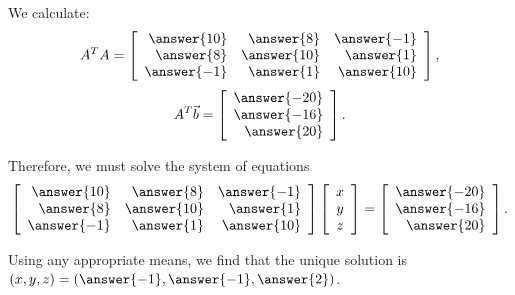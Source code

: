 \documentclass{ximera}
\begin{document}
\begin{example}
  We calculate:
  \begin{equation*}
    A^TA =
    \startmat{rrr}
    \answer{10} & \answer{8} & \answer{-1} \\
    \answer{8}  & \answer{10} & \answer{1} \\
    \answer{-1} & \answer{1} & \answer{10} \\
  \stopmat,
  \end{equation*}
  \begin{equation*}
    A^T\vect{b} =
    \startmat{r} \answer{-20} \\ \answer{-16} \\ \answer{20}  \stopmat.
  \end{equation*}

  Therefore, we must solve the system of equations
 \begin{equation*}
    \startmat{rrr}
      \answer{10} & \answer{8} & \answer{-1} \\
      \answer{8}  & \answer{10} & \answer{1} \\
      \answer{-1} & \answer{1} & \answer{10} \\
    \stopmat
    \startmat{c} x \\ y \\ z \stopmat
    =
    \startmat{r} \answer{-20} \\ \answer{-16} \\ \answer{20}  \stopmat.
  \end{equation*}


  Using any appropriate means, we find that the unique solution is
  $(x,y,z) = (\answer{-1}, \answer{-1}, \answer{2})$.  
  

\end{example}
\end{document}
